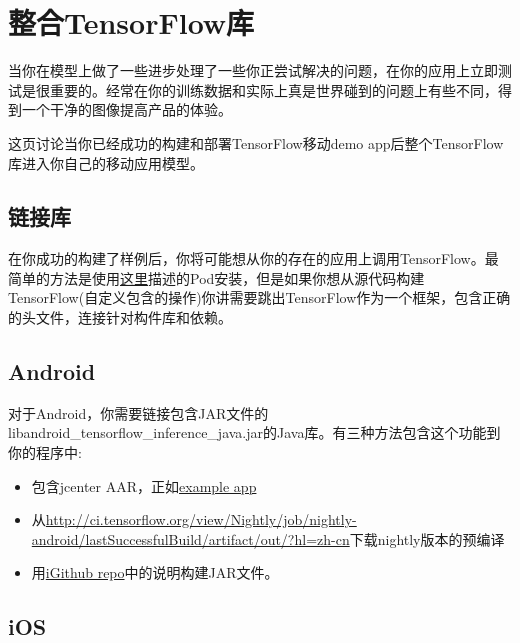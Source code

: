 \section{整合TensorFlow库}
当你在模型上做了一些进步处理了一些你正尝试解决的问题，在你的应用上立即测试是很重要的。经常在你的训练数据和实际上真是世界碰到的问题上有些不同，得到一个干净的图像提高产品的体验。

这页讨论当你已经成功的构建和部署TensorFlow移动demo app后整个TensorFlow库进入你自己的移动应用模型。
\subsection{链接库}
在你成功的构建了样例后，你将可能想从你的存在的应用上调用TensorFlow。最简单的方法是使用\href{https://www.tensorflow.org/mobile/ios_build?hl=zh-cn#using_cocoapods}{这里}描述的Pod安装，但是如果你想从源代码构建TensorFlow(自定义包含的操作)你讲需要跳出TensorFlow作为一个框架，包含正确的头文件，连接针对构件库和依赖。
\subsection{Android}
对于Android，你需要链接包含JAR文件的libandroid\_tensorflow\_inference\_java.jar的Java库。有三种方法包含这个功能到你的程序中:
\begin{itemize}
\item 包含jcenter AAR，正如\href{https://github.com/googlecodelabs/tensorflow-for-poets-2/blob/master/android/build.gradle#L59-L65}{example app}
\item 从\href{ci.tensorflow.org}{http://ci.tensorflow.org/view/Nightly/job/nightly-android/lastSuccessfulBuild/artifact/out/?hl=zh-cn}下载nightly版本的预编译
\item 用\href{https://github.com/tensorflow/tensorflow/tree/master/tensorflow/contrib/android}{iGithub repo}中的说明构建JAR文件。
\end{itemize}
\subsection{iOS}

